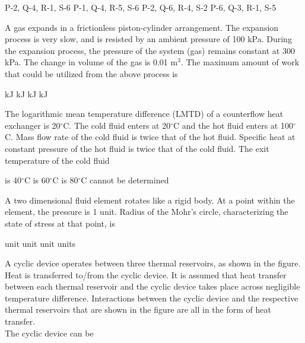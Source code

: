 \documentclass[addpoints,11pt]{exam}
\begin{document}
\begin{questions}
        \begin{oneparchoices}
            \choice P-2, Q-4, R-1, S-6
            \choice P-1, Q-4, R-5, S-6
            \choice P-2, Q-6, R-4, S-2
            \choice P-6, Q-3, R-1, S-5
        \end{oneparchoices}

        \question A gas expands in a frictionless piston-cylinder arrangement. The expansion process is very slow, and is resisted by an ambient pressure of 100 kPa. During the expansion process, the pressure of the system (gas) remains constant at 300 kPa. The change in volume of the gas is 0.01 m$^3$. The maximum amount of work that could be utilized from the above process is

        \begin{oneparchoices}
             kJ
             kJ
             kJ
             kJ
        \end{oneparchoices}

        \question The logarithmic mean temperature difference (LMTD) of a counterflow heat exchanger is 20$^\circ$C. The cold fluid enters at 20$^\circ$C and the hot fluid enters at 100$^\circ$C. Mass flow rate of the cold fluid is twice that of the hot fluid. Specific heat at constant pressure of the hot fluid is twice that of the cold fluid. The exit temperature of the cold fluid

        \begin{oneparchoices}
            \choice is 40$^\circ$C
            \choice is 60$^\circ$C
            \choice is 80$^\circ$C
            \choice cannot be determined
        \end{oneparchoices}

        \question A two dimensional fluid element rotates like a rigid body. At a point within the element, the pressure is 1 unit. Radius of the Mohr's circle, characterizing the state of stress at that point, is

        \begin{oneparchoices}
             unit
             unit
             unit
             units
        \end{oneparchoices}

        \question A cyclic device operates between three thermal reservoirs, as shown in the figure. Heat is transferred to/from the cyclic device. It is assumed that heat transfer between each thermal reservoir and the cyclic device takes place across negligible temperature difference. Interactions between the cyclic device and the respective thermal reservoirs that are shown in the figure are all in the form of heat transfer.\\%
        The cyclic device can be


\end{questions}
\end{document}
